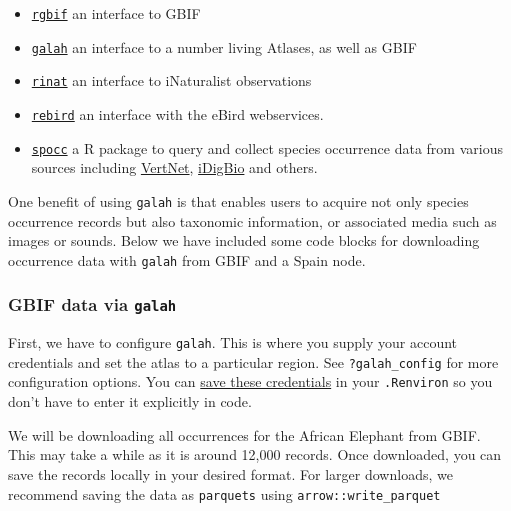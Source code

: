 \documentclass[
  letterpaper,
  DIV=11,
  numbers=noendperiod,
  oneside]{scrreprt}
\providecommand{\tightlist}{%
  \setlength{\itemsep}{0pt}\setlength{\parskip}{0pt}}\usepackage{longtable,booktabs,array}
\begin{document}
\begin{itemize}
\tightlist
\item
  \href{https://docs.ropensci.org/rgbif/}{\texttt{rgbif}} an interface
  to GBIF
\item
  \href{https://galah.ala.org.au/index.html}{\texttt{galah}} an
  interface to a number living Atlases, as well as GBIF
\item
  \href{https://docs.ropensci.org/rinat/}{\texttt{rinat}} an interface
  to iNaturalist observations
\item
  \href{https://docs.ropensci.org/rebird/}{\texttt{rebird}} an interface
  with the eBird webservices.
\item
  \href{https://docs.ropensci.org/spocc/}{\texttt{spocc}} a R package to
  query and collect species occurrence data from various sources
  including \href{https://github.com/ropensci/rvertnet}{VertNet},
  \href{http://www.idigbio.org/}{iDigBio} and others.
\end{itemize}

One benefit of using \texttt{galah} is that enables users to acquire not
only species occurrence records but also taxonomic information, or
associated media such as images or sounds. Below we have included some
code blocks for downloading occurrence data with \texttt{galah} from
GBIF and a Spain node.

\hypertarget{gbif-data-via-galah}{%
\subsubsection{\texorpdfstring{GBIF data via
\texttt{galah}}{GBIF data via galah}}\label{gbif-data-via-galah}}

First, we have to configure \texttt{galah}. This is where you supply
your account credentials and set the atlas to a particular region. See
\texttt{?galah\_config} for more configuration options. You can
\href{https://docs.ropensci.org/rgbif/articles/gbif_credentials.html}{save
these credentials} in your \texttt{.Renviron} so you don't have to enter
it explicitly in code.

We will be downloading all occurrences for the African Elephant from
GBIF. This may take a while as it is around 12,000 records. Once
downloaded, you can save the records locally in your desired format. For
larger downloads, we recommend saving the data as \texttt{parquets}
using \texttt{arrow::write\_parquet}
\end{document}
